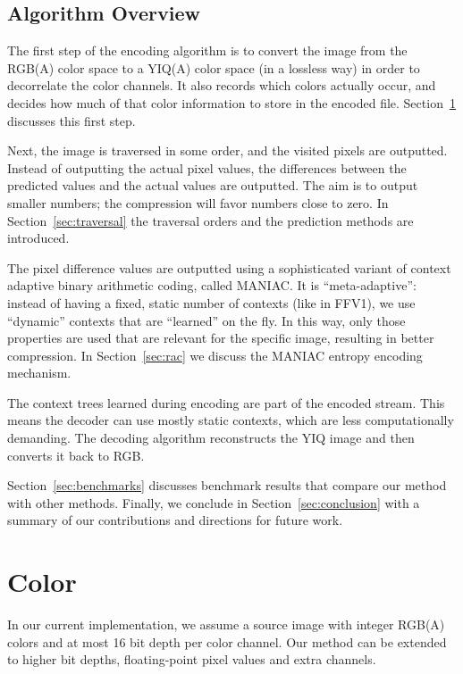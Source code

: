 \documentclass[a4paper,USenglish]{lipics}
\begin{document}
\subsection{Algorithm Overview}

The first step of the encoding algorithm is to convert the image from the RGB(A) color space
to a YIQ(A) color space (in a lossless way) in order to decorrelate the color channels.
It also records which colors actually occur, and decides how much of that color information to store in the encoded file.
Section~\ref{sec:color} discusses this first step.

Next, the image is traversed in some order, and the visited pixels are outputted.
Instead of outputting the actual pixel values, the differences between the predicted values
and the actual values are outputted. The aim is to output smaller numbers; the compression will favor numbers close to zero.
In Section~\ref{sec:traversal} the traversal orders and the prediction methods are introduced.


The pixel difference values are outputted using a sophisticated variant of
context adaptive binary arithmetic coding, called MANIAC. It is ``meta-adaptive'': instead of having a fixed, static
number of contexts (like in FFV1), we use ``dynamic'' contexts that are ``learned'' on the fly.
In this way, only those properties are used that are relevant for the specific image,
resulting in better compression.
In Section~\ref{sec:rac} we discuss the MANIAC entropy encoding mechanism.


The context trees learned during encoding are part of the encoded stream.
This means the decoder can use mostly static contexts, which are less computationally demanding.
The decoding algorithm reconstructs the YIQ image and then converts it back to RGB.

Section~\ref{sec:benchmarks} discusses benchmark results that compare our method with other methods.
Finally, we conclude in Section~\ref{sec:conclusion} with a summary of our contributions and directions for future work.


\section{Color}
\label{sec:color}

In our current implementation,
we assume a source image with integer RGB(A) colors and at most 16 bit depth per color channel.
Our method can be extended to higher bit depths, floating-point pixel values and extra channels.
\end{document}
